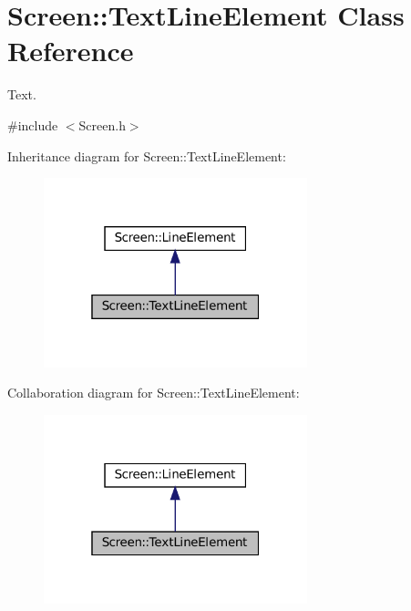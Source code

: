 \hypertarget{classScreen_1_1TextLineElement}{}\section{Screen\+:\+:Text\+Line\+Element Class Reference}
\label{classScreen_1_1TextLineElement}


Text.  




{\ttfamily \#include $<$Screen.\+h$>$}



Inheritance diagram for Screen\+:\+:Text\+Line\+Element\+:\nopagebreak
\begin{figure}[H]
\begin{center}
\leavevmode
\includegraphics[width=217pt]{classScreen_1_1TextLineElement__inherit__graph}
\end{center}
\end{figure}


Collaboration diagram for Screen\+:\+:Text\+Line\+Element\+:\nopagebreak
\begin{figure}[H]
\begin{center}
\leavevmode
\includegraphics[width=217pt]{classScreen_1_1TextLineElement__coll__graph}
\end{center}
\end{figure}
